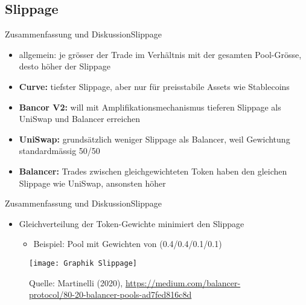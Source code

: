 \documentclass{beamer}
\begin{document}
\subsection{Slippage}

\begin{frame}{Zusammenfassung und Diskussion}{Slippage}
 \begin{itemize}
 \item<1->{allgemein: je grösser der Trade im Verhältnis mit der gesamten Pool-Grösse, desto höher der Slippage}
 \vspace{1em}
 \item<2->{\textbf{Curve:} tiefster Slippage, aber nur für preisstabile Assets wie Stablecoins}
 \item<3->{\textbf{Bancor V2:} will mit Amplifikationsmechanismus tieferen Slippage als UniSwap und Balancer erreichen}
 \item<4->{\textbf{UniSwap:} grundsätzlich weniger Slippage als Balancer, weil Gewichtung standardmässig 50/50}
 \item<5->{\textbf{Balancer:} Trades zwischen gleichgewichteten Token haben den gleichen Slippage wie UniSwap, ansonsten höher}
 \end{itemize}
\end{frame}

\begin{frame}{Zusammenfassung und Diskussion}{Slippage}
\begin{itemize}
\item{Gleichverteilung der Token-Gewichte minimiert den Slippage}
\begin{itemize}
 \item{\begin{scriptsize}{Beispiel: Pool mit Gewichten von (0.4/0.4/0.1/0.1)}\end{scriptsize}}
\end{itemize}
\end{itemize}
\begin{center}
\begin{figure}
\texttt{[image: Graphik Slippage]}
\caption{\tiny{Quelle: Martinelli (2020), \url{https://medium.com/balancer-protocol/80-20-balancer-pools-ad7fed816c8d}}}
\end{figure}
\end{center}
\end{frame}
\end{document}
